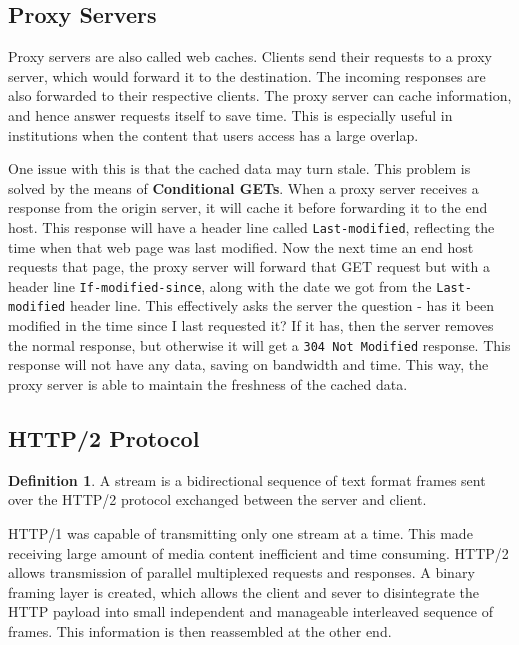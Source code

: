 \documentclass[12pt,letterpaper]{book}
\theoremstyle{definition}
\newtheorem{definition}{Definition}[section] %
\begin{document}
\subsection{Proxy Servers}

Proxy servers are also called web caches. Clients send their requests to a proxy server, which would forward it to the destination. The incoming responses are also forwarded to their respective clients. The proxy server can cache information, and hence answer requests itself to save time. This is especially useful in institutions when the content that users access has a large overlap.

One issue with this is that the cached data may turn stale. This problem is solved by the means of \textbf{Conditional GETs}. When a proxy server receives a response from the origin server, it will cache it before forwarding it to the end host. This response will have a header line called \texttt{Last-modified}, reflecting the time when that web page was last modified. Now the next time an end host requests that page, the proxy server will forward that GET request but with a header line \texttt{If-modified-since}, along with the date we got from the \texttt{Last-modified} header line. This effectively asks the server the question - has it been modified in the time since I last requested it? If it has, then the server removes the normal response, but otherwise it will get a \texttt{304 Not Modified} response. This response will not have any data, saving on bandwidth and time. This way, the proxy server is able to maintain the freshness of the cached data.

\subsection{HTTP/2 Protocol}

\begin{definition}
  A stream is a bidirectional sequence of text format frames sent over the HTTP/2 protocol exchanged between the server and client.
\end{definition}

HTTP/1 was capable of transmitting only one stream at a time. This made receiving large amount of media content inefficient and time consuming. HTTP/2 allows transmission of parallel multiplexed requests and responses. A binary framing layer is created, which allows the client and sever to disintegrate the HTTP payload into small independent and manageable interleaved sequence of frames. This information is then reassembled at the other end.
\end{document}
